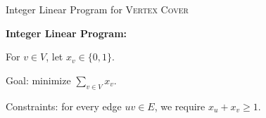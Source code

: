 \documentclass[english]{../spicker}
\begin{document}
\begin{example}{Integer Linear Program for \textsc{Vertex Cover}}

    \textbf{Integer Linear Program:}

    For $v\in V$, let $x_v \in \{0, 1\}$.

    Goal: minimize $\sum_{v\in V}x_v$.

    Constraints: for every edge $uv \in E$, we require $x_u + x_v \geq 1$.
\end{example}

\printbibliography
\end{document}
